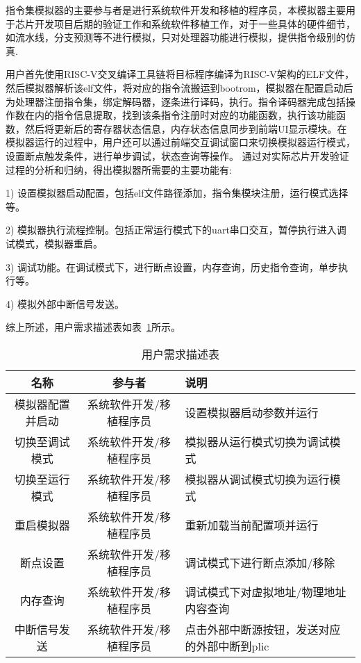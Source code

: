 指令集模拟器的主要参与者是进行系统软件开发和移植的程序员，本模拟器主要用于芯片开发项目后期的验证工作和系统软件移植工作，对于一些具体的硬件细节，如流水线，分支预测等不进行模拟，只对处理器功能进行模拟，提供指令级别的仿真.


用户首先使用RISC-V交叉编译工具链将目标程序编译为RISC-V架构的ELF文件，然后模拟器解析该elf文件，将对应的指令流搬运到bootrom，模拟器在配置启动后为处理器注册指令集，绑定解码器，逐条进行译码，执行。指令译码器完成包括操作数在内的指令信息提取，找到该条指令注册时对应的功能函数，执行该功能函数，然后将更新后的寄存器状态信息，内存状态信息同步到前端UI显示模块。在模拟器运行的过程中，用户还可以通过前端交互调试窗口来切换模拟器运行模式，设置断点触发条件，进行单步调试，状态查询等操作。
通过对实际芯片开发验证过程的分析和归纳，得出模拟器所需要的主要功能有:


1) 设置模拟器启动配置，包括elf文件路径添加，指令集模块注册，运行模式选择等。


2) 模拟器执行流程控制。包括正常运行模式下的uart串口交互，暂停执行进入调试模式，模拟器重启。


3) 调试功能。在调试模式下，进行断点设置，内存查询，历史指令查询，单步执行等。


4) 模拟外部中断信号发送。


综上所述，用户需求描述表如表~\ref{tab:tab1}所示。
\begin{table}[H]
  \centering
  \caption{用户需求描述表}
  \label{tab:tab1}
  \renewcommand\arraystretch{1.2}
  \begin{tabular}{ccl}
    \toprule
    名称   & 参与者   & 说明   \\
    \midrule
    模拟器配置并启动 & 系统软件开发/移植程序员 & \multicolumn{1}{p{5cm}}{设置模拟器启动参数并运行} \\ \hline
    切换至调试模式 &	系统软件开发/移植程序员	& \multicolumn{1}{m{5cm}}{模拟器从运行模式切换为调试模式}\\
    \hline
    切换至运行模式 & 系统软件开发/移植程序员	& \multicolumn{1}{m{5cm}}{模拟器从调试模式切换为运行模式}\\
    \hline
    重启模拟器	& 系统软件开发/移植程序员	& \multicolumn{1}{p{5cm}}{重新加载当前配置项并运行}\\
    \hline
    断点设置 &	系统软件开发/移植程序员 &	\multicolumn{1}{p{5cm}}{调试模式下进行断点添加/移除}\\
    \hline
    内存查询 &	系统软件开发/移植程序员 &	\multicolumn{1}{m{5cm}}{调试模式下对虚拟地址/物理地址内容查询}\\
    \hline
    中断信号发送	& 系统软件开发/移植程序员 &	\multicolumn{1}{m{5cm}}{点击外部中断源按钮，发送对应的外部中断到plic}\\
    \bottomrule
  \end{tabular}
\end{table}


